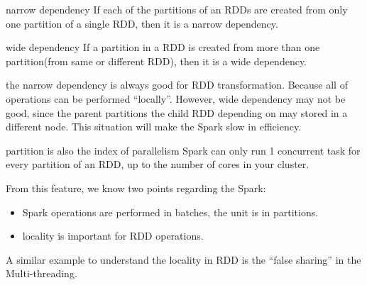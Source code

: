 \documentclass[notheorems, aspectratio=54]{beamer}
\begin{document}
\begin{frame}

\begin{block}{narrow dependency}
 If each of the partitions of an RDDs are created from only one partition of a single RDD, then it is a narrow dependency. 
\end{block}

\begin{block}{wide dependency}
 If a partition in a RDD is created from more than one partition(from same or different RDD), then it is a wide dependency.
\end{block}

the narrow dependency is always good for RDD transformation. Because all of operations can be performed ``locally''. However, wide dependency may not be good, since the parent partitions the child RDD depending on may stored in a different node. This situation will make the Spark slow in efficiency. 

\end{frame}


\begin{frame}

\begin{alertblock}{ partition is also the index of parallelism}
 Spark can only run 1 concurrent task for every partition of an RDD, up to the number of cores in your cluster. 
\end{alertblock}

From this feature, we know two points regarding the Spark:
\begin{itemize}
 \item Spark operations are performed in batches, the unit is in partitions. 
 \item locality is important for RDD operations. 
\end{itemize}
A similar example to understand the locality in RDD is the ``false sharing'' in the Multi-threading.

\end{frame}

\end{document}
